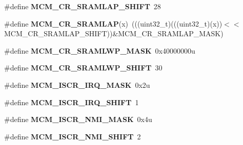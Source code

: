 \begin{DoxyCompactItemize}
\item 
\#define {\bfseries M\+C\+M\+\_\+\+C\+R\+\_\+\+S\+R\+A\+M\+L\+A\+P\+\_\+\+S\+H\+I\+FT}~28\hypertarget{group__MCM__Register__Masks_ga083d0b4e4188e656d92bfa8fb9b4eca9}{}\label{group__MCM__Register__Masks_ga083d0b4e4188e656d92bfa8fb9b4eca9}

\item 
\#define {\bfseries M\+C\+M\+\_\+\+C\+R\+\_\+\+S\+R\+A\+M\+L\+AP}(x)~(((uint32\+\_\+t)(((uint32\+\_\+t)(x))$<$$<$M\+C\+M\+\_\+\+C\+R\+\_\+\+S\+R\+A\+M\+L\+A\+P\+\_\+\+S\+H\+I\+FT))\&M\+C\+M\+\_\+\+C\+R\+\_\+\+S\+R\+A\+M\+L\+A\+P\+\_\+\+M\+A\+SK)\hypertarget{group__MCM__Register__Masks_ga016e1c55cc89e6f0db47095d5c710f06}{}\label{group__MCM__Register__Masks_ga016e1c55cc89e6f0db47095d5c710f06}

\item 
\#define {\bfseries M\+C\+M\+\_\+\+C\+R\+\_\+\+S\+R\+A\+M\+L\+W\+P\+\_\+\+M\+A\+SK}~0x40000000u\hypertarget{group__MCM__Register__Masks_ga93830e2785e77585febe87f0bc83da5c}{}\label{group__MCM__Register__Masks_ga93830e2785e77585febe87f0bc83da5c}

\item 
\#define {\bfseries M\+C\+M\+\_\+\+C\+R\+\_\+\+S\+R\+A\+M\+L\+W\+P\+\_\+\+S\+H\+I\+FT}~30\hypertarget{group__MCM__Register__Masks_ga7c3a04f9ed4a8824e212536c1d783fea}{}\label{group__MCM__Register__Masks_ga7c3a04f9ed4a8824e212536c1d783fea}

\item 
\#define {\bfseries M\+C\+M\+\_\+\+I\+S\+C\+R\+\_\+\+I\+R\+Q\+\_\+\+M\+A\+SK}~0x2u\hypertarget{group__MCM__Register__Masks_ga86ab0b13f7c720c3b9ad33950745d05d}{}\label{group__MCM__Register__Masks_ga86ab0b13f7c720c3b9ad33950745d05d}

\item 
\#define {\bfseries M\+C\+M\+\_\+\+I\+S\+C\+R\+\_\+\+I\+R\+Q\+\_\+\+S\+H\+I\+FT}~1\hypertarget{group__MCM__Register__Masks_ga68080cbb94f82b92990da0f06b9e1fe2}{}\label{group__MCM__Register__Masks_ga68080cbb94f82b92990da0f06b9e1fe2}

\item 
\#define {\bfseries M\+C\+M\+\_\+\+I\+S\+C\+R\+\_\+\+N\+M\+I\+\_\+\+M\+A\+SK}~0x4u\hypertarget{group__MCM__Register__Masks_ga5ca1ab81de3e013c750ffb5afc5608d3}{}\label{group__MCM__Register__Masks_ga5ca1ab81de3e013c750ffb5afc5608d3}

\item 
\#define {\bfseries M\+C\+M\+\_\+\+I\+S\+C\+R\+\_\+\+N\+M\+I\+\_\+\+S\+H\+I\+FT}~2\hypertarget{group__MCM__Register__Masks_ga57455aab19203d7226d9077d8be59a56}{}\label{group__MCM__Register__Masks_ga57455aab19203d7226d9077d8be59a56}


\end{DoxyCompactItemize}
